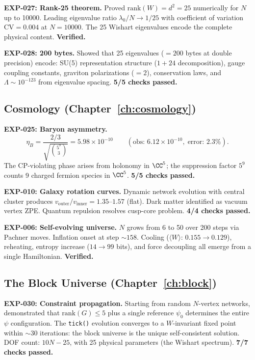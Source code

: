\textbf{EXP-027: Rank-25 theorem.} Proved $\text{rank}(W) = d^2 = 25$ numerically for $N$ up to 10000. Leading eigenvalue ratio $\lambda_0/N \to 1/25$ with coefficient of variation $\text{CV} = 0.004$ at $N = 10000$. The 25 Wishart eigenvalues encode the complete physical content. \textbf{Verified.}

\textbf{EXP-028: 200 bytes.} Showed that 25 eigenvalues ($= 200$ bytes at double precision) encode: SU(5) representation structure ($1 + 24$ decomposition), gauge coupling constants, graviton polarizations ($= 2$), conservation laws, and $\Lambda \sim 10^{-123}$ from eigenvalue spacing. \textbf{5/5 checks passed.}

\subsection{Cosmology (Chapter~\ref{ch:cosmology})}

\textbf{EXP-025: Baryon asymmetry.}
\begin{equation}
\eta_B = \frac{2/3}{\sqrt{\binom{5^9}{3}}} = 5.98 \times 10^{-10} \qquad (\text{obs: } 6.12 \times 10^{-10},\;\text{error: } 2.3\%).
\end{equation}
The CP-violating phase arises from holonomy in $\CC^5$; the suppression factor $5^9$ counts 9 charged fermion species in $\CC^5$. \textbf{5/5 checks passed.}

\textbf{EXP-010: Galaxy rotation curves.} Dynamic network evolution with central cluster produces $v_\text{outer}/v_\text{inner} = 1.35$--$1.57$ (flat). Dark matter identified as vacuum vertex ZPE. Quantum repulsion resolves cusp-core problem. \textbf{4/4 checks passed.}

\textbf{EXP-006: Self-evolving universe.} $N$ grows from 6 to 50 over 200 steps via Pachner moves. Inflation onset at step $\sim 158$. Cooling ($\langle W\rangle$: $0.155 \to 0.129$), reheating, entropy increase ($14 \to 99$ bits), and force decoupling all emerge from a single Hamiltonian. \textbf{Verified.}

\subsection{The Block Universe (Chapter~\ref{ch:block})}

\textbf{EXP-030: Constraint propagation.} Starting from random $N$-vertex networks, demonstrated that $\text{rank}(G) \leq 5$ plus a single reference $\psi_0$ determines the entire $\psi$ configuration. The \texttt{tick()} evolution converges to a $W$-invariant fixed point within $\sim 30$ iterations: the block universe is the unique self-consistent solution. DOF count: $10N - 25$, with 25 physical parameters (the Wishart spectrum). \textbf{7/7 checks passed.}


